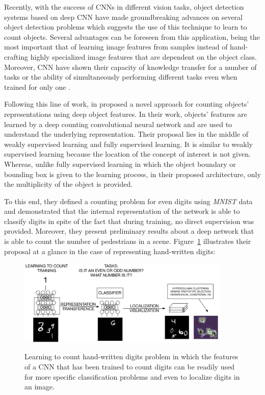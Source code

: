 Recently, with the success of CNNs in different vision tasks, object detection systems based on deep CNN have made groundbreaking advances on several object detection problems\cite{zhang2015improving, erhan2014scalable, girshick2014rich, he2015spatial, erhan2014scalable} which suggests the use of this technique to learn to count objects. Several advantages can be foreseen from this application, being the most important that of learning image features from samples instead of hand-crafting highly specialized image features that are dependent on the object class\cite{segui2015learning}. Moreover, CNN have shown their capacity of knowledge transfer for a number of tasks or the ability of simultaneously performing different tasks even when trained for only one \cite{zhou2014learning}. 

Following this line of work,  in \cite{segui2015learning} proposed a novel approach for counting objects' representations using deep object features. In their work, objects' features are learned by a deep counting convolutional neural network and are used to understand the underlying representation. Their proposal lies in the middle of weakly supervised learning and fully supervised learning\cite{mohri2012foundations}. It is similar to weakly supervised learning because the location of the concept of interest is not given. Whereas, unlike fully supervised learning in which the object boundary or bounding box is given to the learning process, in their proposed architecture, only the multiplicity of the object is provided\cite{segui2015learning}.

To this end, they defined a counting problem for even digits using \textit{MNIST} data and demonstrated that the internal representation of the network is able to classify digits in spite of the fact that during training, no direct supervision was provided. Moreover, they present preliminary results about a deep network that is able to count the number of pedestrians in a scene\cite{segui2015learning}. Figure~\ref{fig:santimnist} illustrates their proposal at a glance in the case of representing hand-written digits:
\begin{figure}[H]
	\centering
	{\includegraphics[width=0.9\textwidth]{images/santimnist}}
	\caption{Learning to count hand-written digits problem in which the features of a CNN that has been trained to count digits can be readily used for more specific classification problems and even to localize digits in an image\cite{segui2015learning}.}
	\label{fig:santimnist}
\end{figure}

